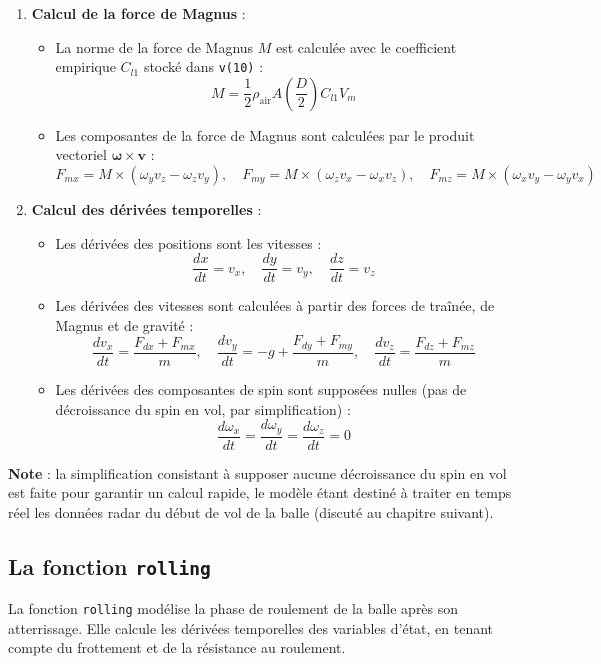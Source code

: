 \documentclass[10pt,a4paper]{report}
\begin{document}
\begin{enumerate}
    \item \textbf{Calcul de la force de Magnus} :
    \begin{itemize}
        \item La norme de la force de Magnus \(M\) est calculée avec le coefficient empirique \(C_{l1}\) stocké dans \texttt{v(10)} :
        \[
        M = \frac{1}{2} \rho_{\text{air}} A \left(\frac{D}{2}\right) C_{l1} V_m
        \]
        \item Les composantes de la force de Magnus sont calculées par le produit vectoriel \(\boldsymbol{\omega} \times \mathbf{v}\) :
        \[
        F_{mx} = M \times (\omega_y v_z - \omega_z v_y), \quad F_{my} = M \times (\omega_z v_x - \omega_x v_z), \quad F_{mz} = M \times (\omega_x v_y - \omega_y v_x)
        \]
    \end{itemize}

    \item \textbf{Calcul des dérivées temporelles} :
    \begin{itemize}
        \item Les dérivées des positions sont les vitesses :
        \[
        \frac{dx}{dt} = v_x, \quad \frac{dy}{dt} = v_y, \quad \frac{dz}{dt} = v_z
        \]
        \item Les dérivées des vitesses sont calculées à partir des forces de traînée, de Magnus et de gravité :
        \[
        \frac{dv_x}{dt} = \frac{F_{dx} + F_{mx}}{m}, \quad \frac{dv_y}{dt} = -g + \frac{F_{dy} + F_{my}}{m}, \quad \frac{dv_z}{dt} = \frac{F_{dz} + F_{mz}}{m}
        \]
        \item Les dérivées des composantes de spin sont supposées nulles (pas de décroissance du spin en vol, par simplification) :
        \[
        \frac{d\omega_x}{dt} = \frac{d\omega_y}{dt} = \frac{d\omega_z}{dt} = 0
        \]
    \end{itemize}
\end{enumerate}

\textbf{Note} : la simplification consistant à supposer aucune décroissance du spin en vol est faite pour garantir un calcul rapide, le modèle étant destiné à traiter en temps réel les données radar du début de vol de la balle (discuté au chapitre suivant).

\bigskip
\subsection{La fonction \texttt{rolling}}
\label{subsec:rolling}

La fonction \texttt{rolling} modélise la phase de roulement de la balle après son atterrissage. Elle calcule les dérivées temporelles des variables d'état, en tenant compte du frottement et de la résistance au roulement.
\end{document}
